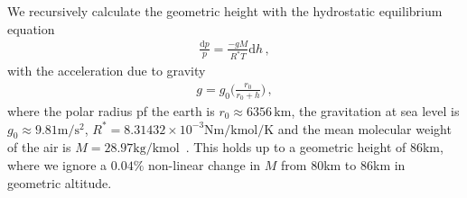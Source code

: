 We recursively calculate the geometric height with the hydrostatic equilibrium equation
\begin{align}
	\frac{\text{d}p}{p} = \frac{- g M}{R^* T} \text{d} h \, ,\label{eq:hydr}
\end{align}
with the acceleration due to gravity
\begin{align}
	g = g_0 \Bigg( \frac{r_0}{r_0 + h} \Bigg) \, ,
\end{align}
where the polar radius pf the earth is $r_0 \approx 6356 \, \text{km}$, the gravitation at sea level is $g_0 \approx 9.81 \text{m}/\text{s}^2$, $R^* = 8.31432 \times 10^{-3} \text{Nm} / \text{kmol} / \text{K}$ and the mean molecular weight of the air is $M = 28.97 \text{kg/kmol}$~\cite{atmosphere1976us}.
This holds up to a geometric height of $86$km, where we ignore a $0.04\%$ non-linear change in $M$ from $80$km to $86$km in geometric altitude.

